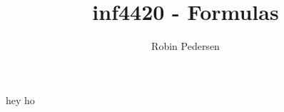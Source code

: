 \documentclass[a4paper,twocolumn]{article}
\begin{document}
  \title{inf4420 - Formulas}
  \author{Robin Pedersen}
  \maketitle

  hey ho
\end{document}
